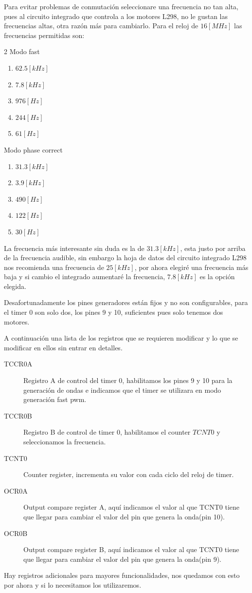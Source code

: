 Para evitar problemas de conmutación seleccionare una frecuencia no tan alta, pues
al circuito integrado que controla a los motores L298, no le gustan las frecuencias
altas, otra razón más para cambiarlo. Para el reloj de $16[MHz]$ las frecuencias
permitidas son:
	
\begin{multicols}{2}
Modo fast
\begin{enumerate}
	\item $62.5[kHz]$
	\item $7.8[kHz]$
	\item $976[Hz]$
	\item $244[Hz]$
	\item $61[Hz]$
\end{enumerate}
Modo phase correct
\begin{enumerate}
	\item $31.3[kHz]$
	\item $3.9[kHz]$
	\item $490[Hz]$
	\item $122[Hz]$
	\item $30[Hz]$
\end{enumerate}
\end{multicols}
La frecuencia más interesante sin duda es la de $31.3[kHz]$, esta justo por arriba
de la frecuencia audible, sin embargo la hoja de datos del circuito integrado
L298 nos
recomienda una frecuencia de $25[kHz]$, por ahora elegiré una frecuencia más 
baja y si cambio el integrado aumentaré la frecuencia, $7.8[kHz]$ es la opción 
elegida. 

Desafortunadamente los pines generadores están fijos y no son configurables, para
el timer 0 son solo dos, los pines 9 y 10, suficientes pues solo tenemos dos motores.

A continuación una lista de los registros que se requieren modificar y lo que se
modificar en ellos sin entrar en detalles.
\begin{description}
	\item[TCCR0A] Registro A de control del timer 0, habilitamos los pines 
		9 y 10 para la generación de ondas e indicamos que el timer se
		utilizara en modo generación fast pwm.
	\item[TCCR0B] Registro B de control de timer 0, habilitamos el counter 
		$TCNT0$ y seleccionamos la frecuencia.
	\item[TCNT0] Counter register, incrementa su valor con cada ciclo del
		reloj de timer.
	\item[OCR0A] Output compare register A, aquí indicamos el valor al que
		TCNT0 tiene que llegar para cambiar el valor del pin que genera
		la onda(pin 10).
	\item[OCR0B] Output compare register B, aquí indicamos el valor al que
		TCNT0 tiene que llegar para cambiar el valor del pin que genera
		la onda(pin 9).
\end{description}
Hay registros adicionales para mayores funcionalidades, nos quedamos con esto por
ahora y si lo necesitamos los utilizaremos.

